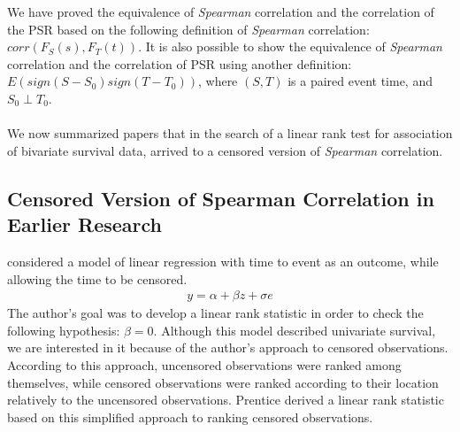 \documentclass[]{article}
\begin{document}
We have proved the equivalence of \emph{Spearman} correlation and the correlation of the PSR based on the following definition of \emph{Spearman} correlation: $corr(F_S(s), F_T(t))$. It is also possible to show the equivalence of \emph{Spearman} correlation and the correlation of PSR using another definition: $E(sign(S-S_0)sign(T-T_0))$, where $(S,T)$ is a paired event time, and $S_0 \perp T_0$.\\
~\\
We now summarized papers that in the search of a linear rank test for association of bivariate survival data, arrived to a censored version of \emph{Spearman} correlation.


\subsection{Censored Version of Spearman Correlation in Earlier Research}

\cite{prentice1978linear}  considered a model of linear regression with time to event as an outcome, while allowing the time to be censored.
	$$
	\begin{aligned}
		y = \alpha + \beta z + \sigma e
	\end{aligned}
	$$
The author's goal was to develop a linear rank statistic in order to check the following hypothesis: $\beta = 0$. Although this model described univariate survival, we are interested in it because of the author's approach to censored observations.
According to this approach, uncensored observations were ranked among themselves, while censored observations were ranked according to their location relatively to the uncensored observations. Prentice derived a linear rank statistic based on this simplified approach to ranking censored observations.\\
\end{document}
